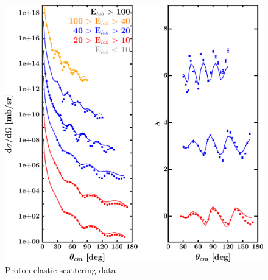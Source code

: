 \begin{figure}[H]
    \centering
    \begin{minipage}{0.45\textwidth}
        \centering
        \includegraphics[width=1.0\textwidth]{figures/sn124_protonElastic.png}
        \caption{Proton elastic scattering data}
        \label{DOMFitData_sn124_proton_elastic}
    \end{minipage}\hfill
    \begin{minipage}{0.45\textwidth}
        \centering

\end{minipage}
\end{figure}
